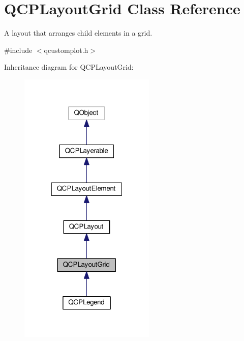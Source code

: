 \hypertarget{classQCPLayoutGrid}{}\section{Q\+C\+P\+Layout\+Grid Class Reference}
\label{classQCPLayoutGrid}


A layout that arranges child elements in a grid.  




{\ttfamily \#include $<$qcustomplot.\+h$>$}



Inheritance diagram for Q\+C\+P\+Layout\+Grid\+:\nopagebreak
\begin{figure}[H]
\begin{center}
\leavevmode
\includegraphics[width=184pt]{classQCPLayoutGrid__inherit__graph}
\end{center}
\end{figure}


